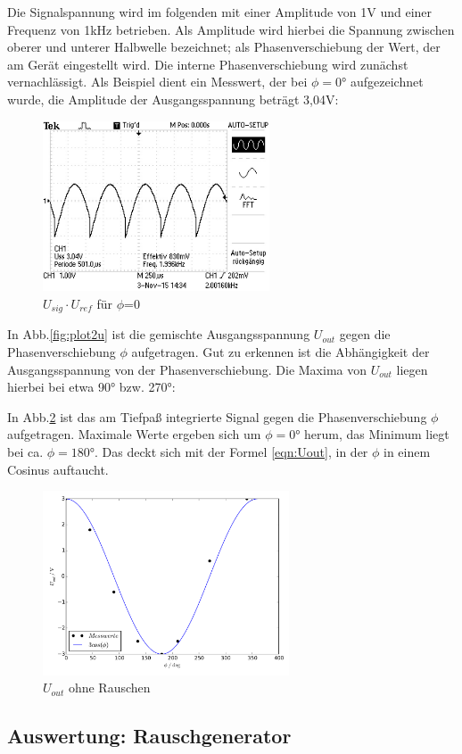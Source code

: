 Die Signalspannung wird im folgenden mit einer Amplitude von 1V und einer
Frequenz von 1kHz betrieben. Als Amplitude wird hierbei die Spannung zwischen
oberer und unterer Halbwelle bezeichnet; als Phasenverschiebung der Wert, der am
Gerät eingestellt wird. Die interne Phasenverschiebung wird zunächst
vernachlässigt. Als Beispiel dient ein Messwert, der bei $\phi = 0°$
aufgezeichnet wurde, die Amplitude der Ausgangsspannung beträgt 3,04V:
\begin{figure}[H]
  \centering
  \includegraphics[angle=90,height=0.3\textwidth,width=0.6\textwidth]
  {graphics/ALL0031/F0031TEK.jpg}
  \caption{$U_{sig} \cdot U_{ref}$ für $\phi$=0}
  \label{fig:2/phi0}
\end{figure}

In Abb.\ref{fig:plot2u} ist die gemischte Ausgangsspannung $U_{out}$ gegen die
Phasenverschiebung $\phi$ aufgetragen. Gut zu erkennen ist die Abhängigkeit
der Ausgangsspannung von der Phasenverschiebung. Die Maxima von $U_{out}$
liegen hierbei bei etwa 90° bzw. 270°:

In Abb.\ref{fig:plot2low} ist das am Tiefpaß integrierte Signal gegen die
Phasenverschiebung $\phi$ aufgetragen. Maximale Werte ergeben sich um $\phi = 0°$
herum, das Minimum liegt bei ca. $\phi = 180°$. Das deckt sich mit der Formel
\eqref{eqn:Uout}, in der $\phi$ in einem Cosinus auftaucht.
\begin{figure}[H]
  \centering
  \includegraphics[height=0.35\textwidth,width=0.65\textwidth]{plot2low.pdf}
  \caption{$U_{out}$ ohne Rauschen}
  \label{fig:plot2low}
\end{figure}


\subsection{Auswertung: Rauschgenerator}

